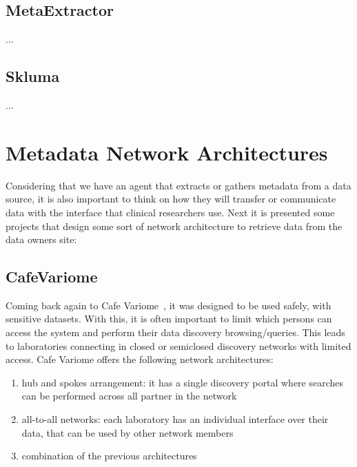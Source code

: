 \subsection*{MetaExtractor}
...

\subsection*{Skluma}
...


\section{Metadata Network Architectures}  %

Considering that we have an agent that extracts or gathers metadata from a data source,
it is also important to think on how they will transfer or communicate data with the
interface that clinical researchers use.
Next it is presented some projects that design some sort of network architecture to
retrieve data from the data owners site:


\subsection*{CafeVariome}
Coming back again to Cafe Variome~\cite{cafevariome}, it was designed to be used safely, with sensitive datasets.
With this, it is often important to limit which persons can access the system and perform their data discovery browsing/queries.
This leads to laboratories connecting in closed or semiclosed discovery networks with limited access.
Cafe Variome offers the following network architectures:
\begin{enumerate}
    \item hub and spokes arrangement: it has a single discovery portal where searches can be performed across all partner in the network
    \item all-to-all networks: each laboratory has an individual interface over their data, that can be used by other network members
    \item combination of the previous architectures
\end{enumerate}

